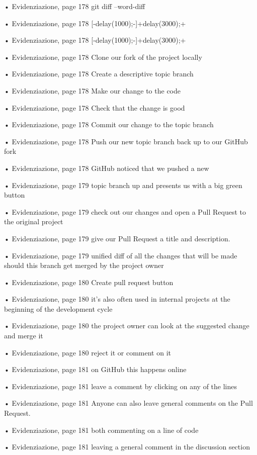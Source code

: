 • Evidenziazione, page 178
git diff --word-diff

• Evidenziazione, page 178
[-delay(1000);-]{+delay(3000);+}

• Evidenziazione, page 178
[-delay(1000);-]{+delay(3000);+}

• Evidenziazione, page 178
Clone our fork of the project locally

• Evidenziazione, page 178
Create a descriptive topic branch

• Evidenziazione, page 178
Make our change to the code

• Evidenziazione, page 178
Check that the change is good

• Evidenziazione, page 178
Commit our change to the topic branch

• Evidenziazione, page 178
Push our new topic branch back up to our GitHub fork

• Evidenziazione, page 178
GitHub noticed that we pushed a new

• Evidenziazione, page 179
topic branch up and presents us with a big green button

• Evidenziazione, page 179
check out our changes and open a Pull Request to the original project

• Evidenziazione, page 179
give our Pull Request a title and description.

• Evidenziazione, page 179
unified diff of all the changes that will be made should this branch get merged by the project owner

• Evidenziazione, page 180
Create pull request button

• Evidenziazione, page 180
it’s also often used in internal projects at the beginning of the development cycle

• Evidenziazione, page 180
the project owner can look at the suggested change and merge it

• Evidenziazione, page 180
reject it or comment on it

• Evidenziazione, page 181
on GitHub this happens online

• Evidenziazione, page 181
leave a comment by clicking on any of the lines

• Evidenziazione, page 181
Anyone can also leave general comments on the Pull Request.

• Evidenziazione, page 181
both commenting on a line of code

• Evidenziazione, page 181
leaving a general comment in the discussion section

